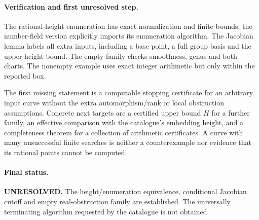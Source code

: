\documentclass[11pt]{article}
\begin{document}
\paragraph{Verification and first unresolved step.}
The rational-height enumeration has exact normalization and finite
bounds; the number-field version explicitly imports its enumeration
algorithm. The Jacobian lemma labels all extra inputs, including a
base point, a full group basis and the upper height bound. The empty
family checks smoothness, genus and both charts. The nonempty example
uses exact integer arithmetic but only within the reported box.

The first missing statement is a computable stopping certificate for
an arbitrary input curve without the extra automorphism/rank or local
obstruction assumptions. Concrete next targets are a certified upper
bound $H$ for a further family, an effective comparison with the
catalogue's embedding height, and a completeness theorem for a
collection of arithmetic certificates. A curve with many unsuccessful
finite searches is neither a counterexample nor evidence that its
rational points cannot be computed.

\paragraph{Final status.}
\textbf{UNRESOLVED.} The height/enumeration equivalence, conditional
Jacobian cutoff and empty real-obstruction family are established.
The universally terminating algorithm requested by the catalogue is
not obtained.
\end{document}
